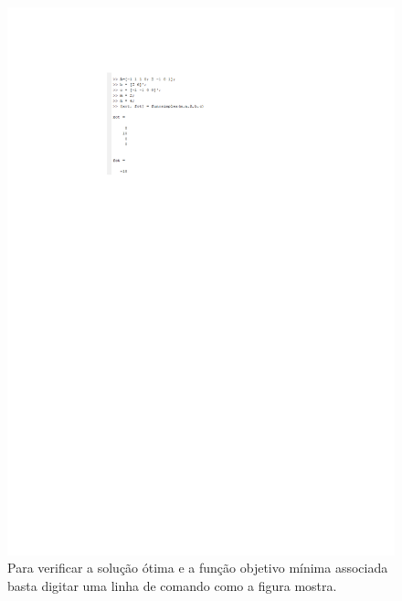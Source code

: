 \documentclass[10pt]{article}
\begin{document}
\begin{figure}[H]
    \centering
    \includegraphics[scale = 0.65]{fig7teste.pdf}
    \caption{Para verificar a solução ótima e a função objetivo mínima associada basta digitar uma linha de comando como a figura mostra.}
\end{figure}
\end{document}
